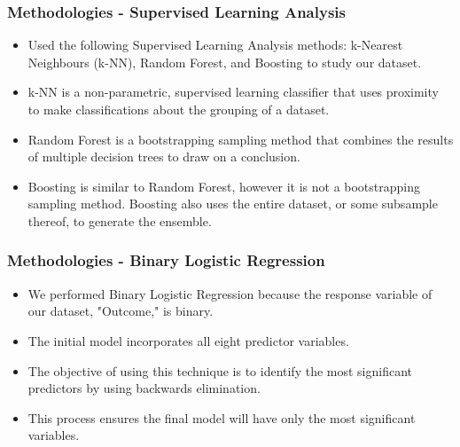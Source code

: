 \documentclass{beamer}
\begin{document}
\begin{frame}
\end{frame}

\begin{frame}
    \frametitle{Methodologies - Supervised Learning Analysis}
        \begin{itemize}
            \setlength\itemsep{1em}
            \item Used the following Supervised Learning Analysis methods: k-Nearest Neighbours (k-NN), Random Forest, and Boosting to study our dataset.
            \item k-NN is a non-parametric, supervised learning classifier that uses proximity to make classifications about the grouping of a dataset.
            \item Random Forest is a bootstrapping sampling method that combines the results of multiple decision trees to draw on a conclusion.
            \item Boosting is similar to Random Forest, however it is not a bootstrapping sampling method. Boosting also uses the entire dataset, or some subsample thereof, to generate the ensemble.
        \end{itemize}
\end{frame}

\begin{frame}
    \frametitle{Methodologies - Binary Logistic Regression}
        \begin{itemize}
            \setlength\itemsep{1em}
            \item We performed Binary Logistic Regression because the response variable of our dataset, "Outcome," is binary.
            \item The initial model incorporates all eight predictor variables.
            \item The objective of using this technique is to identify the most significant predictors by using backwards elimination.
            \item This process ensures the final model will have only the most significant variables.
        \end{itemize}
\end{frame}

\end{document}
